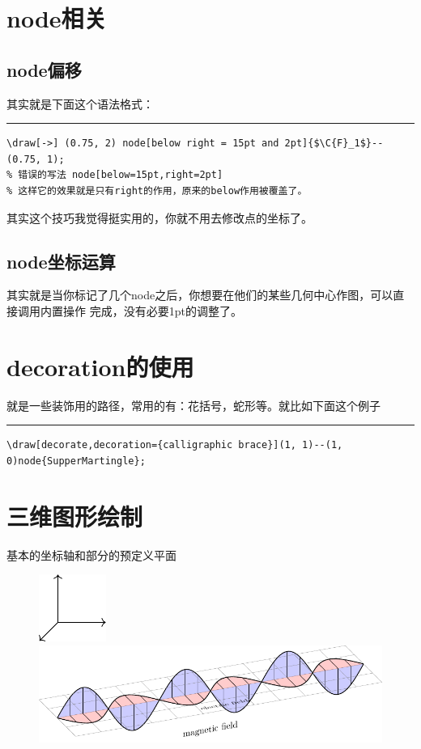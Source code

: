 \documentclass[12pt]{article}
\newcommand{\sep}{\noindent\rule{0.95\linewidth}{2pt}\par}
\begin{document}
\section{node相关}
\subsection{node偏移}
其实就是下面这个语法格式：

\sep
\begin{verbatim}
\draw[->] (0.75, 2) node[below right = 15pt and 2pt]{$\C{F}_1$}--(0.75, 1);
% 错误的写法 node[below=15pt,right=2pt]
% 这样它的效果就是只有right的作用，原来的below作用被覆盖了。
\end{verbatim}
其实这个技巧我觉得挺实用的，你就不用去修改点的坐标了。



\subsection{node坐标运算}
其实就是当你标记了几个node之后，你想要在他们的某些几何中心作图，可以直接调用内置操作
完成，没有必要1pt的调整了。

\clearpage
\section{decoration的使用}
就是一些装饰用的路径，常用的有：花括号，蛇形等。就比如下面这个例子

\sep
\begin{verbatim}
\draw[decorate,decoration={calligraphic brace}](1, 1)--(1, 0)node{SupperMartingle};
\end{verbatim}

\section{三维图形绘制}
基本的坐标轴和部分的预定义平面

\begin{figure}[!htb]
    \centering
    \includegraphics[scale=1]{./pics/coor-3d.pdf}
    \includegraphics[scale=1]{./pics/dna.pdf}
\end{figure}
\end{document}
